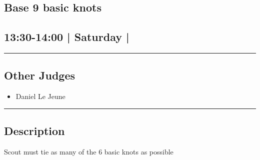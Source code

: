 \documentclass[10pt, A5]{article}
\begin{document}
	

		\begin{framed}
			\begin{minipage}{\textwidth}

			\setcounter{section}{36}
							\section{\faStar \: Base 9 \faStar \: 6 basic knots}
						
			\subsection*{13:30-14:00 | Saturday | }

			\vspace{0.25cm}
			\hrule
			\vspace{0.25cm}


			\subsection*{Other Judges}
							

				\begin{multicols}{2}

			\begin{itemize}
											\item Daniel Le Jeune
								\end{itemize}

			\vfill\null
			\columnbreak

			\begin{itemize}
								\end{itemize}

			\vfill\null

			\end{multicols}

			\vspace{0.25cm}
			\hrule
			\vspace{0.25cm}

			\begin{minipage}{\textwidth}
			\subsection*{\faListAlt \: Description}
			Scout must tie as many of the 6 basic knots as possible
			\end{minipage}


	\end{minipage}
	\end{framed}
\end{document}
